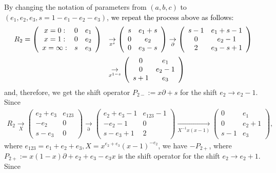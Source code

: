 \documentclass[a4paper,12pt]{article}
\theoremstyle{definition}
\theoremstyle{remark}
\numberwithin{equation}{section} %
\newcommand{\blue}[1]{\textcolor{black}{#1}}
\begin{document}
By changing the notation of parameters
from $(a,b,c)$ to $(e_1,e_2,e_3,s=1-e_1-e_2-e_3)$, \blue{we repeat the process above as follows: }
\[
\begin{array}{ll}
  R_2=\left( \begin{array}{ccc}
x=0:&0&e_1\\
x=1:&0&e_2\\
x=\infty:&s&e_3\end{array}\right)
&  
\underset{x^s}{\to}
\left( \begin{array}{cc}
s&e_1+s\\
0&e_2\\
0&e_3-s\end{array}\right)\underset{\partial}{\to}
\left( \begin{array}{cc}
s-1&e_1+s-1\\
0&e_2-1\\
2&e_3-s+1\end{array}\right)\\  \noalign{\medskip}&
\underset{x^{1-s}}{\to}
\left( \begin{array}{cc}
0&e_1\\
0&e_2-1\\
s+1&e_3\end{array}\right)
\end{array} \]
  and, therefore, we get the shift operator $P_{2-}:=x\partial+s$ for the shift $e_2\to e_2-1$. Since
  \[ \begin{array}{l}       %
R_2 %
 \underset{X}{\to}
\left( \begin{array}{cc}
e_2+e_3&e_{123}\\
-e_2&0\\
s-e_3&0\end{array}\right)\underset{\partial}{\to}
\left( \begin{array}{cc}
e_2+e_3-1&e_{123}-1\\
-e_2-1&0\\
s-e_3+1&2\end{array}\right) %
 \underset{X^{-1}x(x-1)}{\to}
\left( \begin{array}{cc}
0&e_1\\
0&e_2+1\\
s-1&e_3\end{array}\right),
\end{array} \]
  where $e_{123}=e_1+e_2+e_3,X=x^{e_2+e_3}(x-1)^{-e_2}$, we have $-P_{2+}$,
  where $P_{2+}:=x(1-x)\partial+e_2+e_3-e_3x$ is the shift operator for the shift $e_2\to e_2+1$. Since
\end{document}
